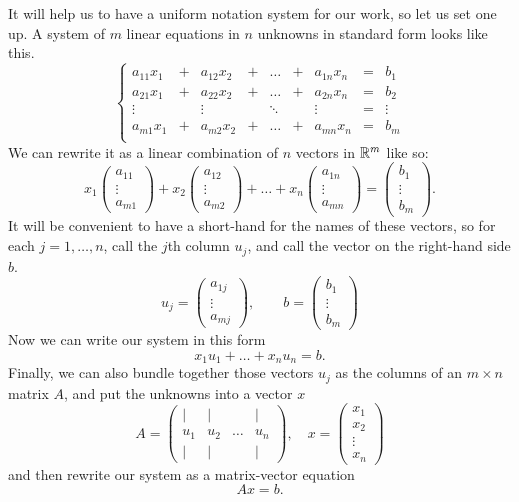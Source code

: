 \documentclass[00-livre-main.tex]{subfiles}
\begin{document}
It will help us to have a uniform notation system for our work, so let us set one up. 
A system of $m$ linear equations in $n$ unknowns in standard form looks like this.
\[
\left\{\begin{array}{rrrrrrrrr}
a_{11}x_1 & + & a_{12} x_2 & + & \dots & + & a_{1n}x_n & = & b_1 \\
a_{21}x_1 & + & a_{22} x_2 & + & \dots & + & a_{2n}x_n & = & b_2 \\
\vdots &  & \vdots &  & \ddots & & \vdots & = & \vdots \\
a_{m1}x_1 & + & a_{m2} x_2 & + & \dots & + & a_{mn}x_n & = & b_m \\
\end{array}\right. 
\]
We can rewrite it as a linear combination of $n$ vectors in $\mathbb{R}^m$ like so:
\[
x_1 \begin{pmatrix} a_{11}\\ \vdots \\ a_{m1} \end{pmatrix} + 
x_2 \begin{pmatrix} a_{12}\\ \vdots \\ a_{m2} \end{pmatrix} +
\dots +
x_n \begin{pmatrix} a_{1n}\\ \vdots \\ a_{mn} \end{pmatrix} = 
\begin{pmatrix} b_1\\ \vdots \\ b_m \end{pmatrix} .
\]
It will be convenient to have a short-hand for the names of these vectors, so for 
each $j=1,\ldots, n$, call the $j$th column $u_j$, and call the vector on the right-hand side $b$.
\[
u_j = \begin{pmatrix} a_{1j} \\ \vdots \\ a_{mj} \end{pmatrix}, \qquad
b = \begin{pmatrix} b_1 \\ \vdots \\ b_m \end{pmatrix}
\]
Now we can write our system in this form 
\[ x_1 u_1 + \dots + x_n u_n = b.\]
Finally, we can also bundle together those vectors $u_j$ as the columns of an $m\times n$ matrix $A$, and put the unknowns into a vector $x$
\[
A = \begin{pmatrix} | & | &  & | \\ u_1 & u_2 & \dots & u_n \\ | & | &  & | \end{pmatrix}, \quad x = \begin{pmatrix} x_1 \\ x_2 \\ \vdots \\ x_n \end{pmatrix}
\]
and then rewrite our system as a matrix-vector equation
\[Ax = b.\]
\end{document}
